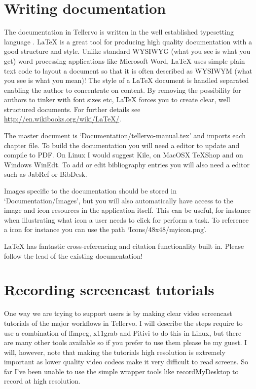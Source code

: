 \section{Writing documentation}
The documentation in Tellervo is written in the well established typesetting language {\LaTeXe}.  {\LaTeX} is a great tool for producing high quality documentation with a good structure and style.  Unlike standard WYSIWYG (what you see is what you get) word processing applications like Microsoft Word, {\LaTeX} uses simple plain text code to layout a document so that it is often described as WYSIWYM (what you see is what you mean)!  The style of a {\LaTeX} document is handled separated enabling the author to concentrate on content.  By removing the possibility for authors to tinker with font sizes etc, {\LaTeX} forces you to create clear, well structured documents.  For further details see \url{http://en.wikibooks.org/wiki/LaTeX/}.

The master document is `Documentation/tellervo-manual.tex' and imports each chapter file.  To build the documentation you will need a editor to update and compile to PDF.  On Linux I would suggest Kile, on MacOSX TeXShop and on Windows WinEdt.  To add or edit bibliography entries you will also need a {\BibTeX} editor such as JabRef or BibDesk.

Images specific to the documentation should be stored in `Documentation/Images', but you will also automatically have access to the image and icon resources in the application itself.  This can be useful, for instance when illustrating what icon a user needs to click for perform a task.  To reference a icon for instance you can use the path `Icons/48x48/myicon.png'.

{\LaTeX} has fantastic cross-referencing and citation functionality built in.  Please follow the lead of the existing documentation!

\section{Recording screencast tutorials}
One way we are trying to support users is by making clear video screencast tutorials of the major workflows in Tellervo.  I will describe the steps require to use a combination of ffmpeg, x11grab and Pitivi to do this in Linux, but there are many other tools available so if you prefer to use them please be my guest.  I will, however, note that making the tutorials high resolution is extremely important as lower quality video codecs make it very difficult to read screens.  So far I've been unable to use the simple wrapper tools like recordMyDesktop to record at high resolution.

